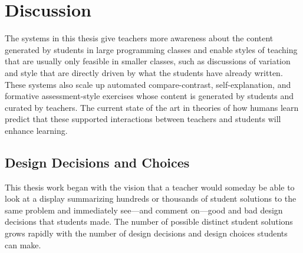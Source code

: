\documentclass[12pt,twoside]{mitthesis}
\begin{document}

%
\pagestyle{plain}
%

\pagestyle{fancyplain}
\addtolength{\headheight}{\baselineskip}

%
%
%
%
%
%
%
\chapter{Discussion}\label{chapter:discussion}

The systems in this thesis give teachers more awareness about the content generated by students in large programming classes and enable styles of teaching that are usually only feasible in smaller classes, such as discussions of variation and style that are directly driven by what the students have already written. These systems also scale up automated compare-contrast, self-explanation, and formative assessment-style exercises whose content is generated by students and curated by teachers. The current state of the art in theories of how humans learn predict that these supported interactions between teachers and students will enhance learning.

\section{Design Decisions and Choices}


This thesis work began with the vision that a teacher would someday be able to look at a display summarizing hundreds or thousands of student solutions to the same problem and immediately see---and comment on---good and bad design decisions that students made. The number of possible distinct student solutions grows rapidly with the number of design decisions and design choices students can make. 
\end{document}
